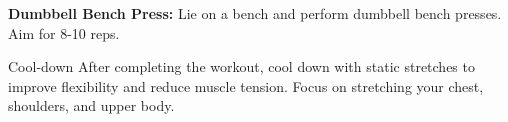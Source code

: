 \documentclass{article}
\newcounter{workout}
\newcounter{exercise}
\begin{document}
\begin{tcolorbox}[colback=gray!15,colframe=black,enforce breakable,pad at break*=5mm,boxrule=0.5mm]
		\begin{exercisebox}
			\textbf{Dumbbell Bench Press:} Lie on a bench and perform dumbbell bench presses. Aim for 8-10 reps.
		\end{exercisebox}
		
		\begin{workoutbox}{Cool-down}
			After completing the workout, cool down with static stretches to improve flexibility and reduce muscle tension. Focus on stretching your chest, shoulders, and upper body.
		\end{workoutbox}
		
	\end{tcolorbox}
	
\end{document}
